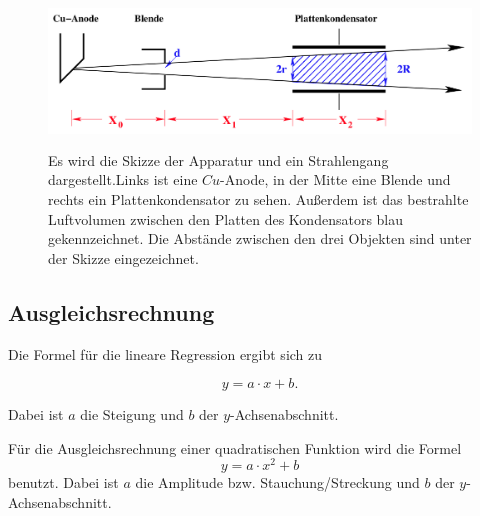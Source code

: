 \begin{figure}
    \centering
    \includegraphics[width=12cm, height=4cm]{build/strahl.png}
    \caption{Es wird die Skizze der Apparatur und ein Strahlengang dargestellt.Links ist eine $Cu$-Anode, in der Mitte eine Blende und rechts ein Plattenkondensator zu sehen. Außerdem ist das bestrahlte Luftvolumen zwischen den Platten des Kondensators blau gekennzeichnet. Die Abstände zwischen den drei Objekten sind unter der Skizze eingezeichnet.\cite{V607}}
    \label{fig:Strahlgeometrie}
\end{figure}

\subsection{Ausgleichsrechnung}

Die Formel für die lineare Regression ergibt sich zu 

\begin{equation}
    y = a \cdot x + b.
    \label{eqn:linreg}
\end{equation}

\noindent Dabei ist $a$ die Steigung und $b$ der $y$-Achsenabschnitt.

\noindent Für die Ausgleichsrechnung einer quadratischen Funktion wird die Formel 
\begin{equation}
    y = a \cdot x^2 + b
    \label{eqn:quadreg}
\end{equation}
benutzt.
Dabei ist $a$ die Amplitude bzw. Stauchung/Streckung und $b$ der $y$-Achsenabschnitt.

